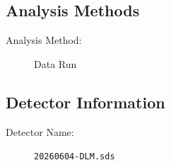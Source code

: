 \documentclass[UTF8,10pt,a4paper,fontset=fandol]{ctexart}
\newcommand{\fieldvalue}[1]{#1}
\newcommand{\handwritten}[1]{#1}
\begin{document}
\subsection{Analysis Methods}

\begin{description}
  \item[Analysis Method:]%
  \fieldvalue{Data Run}
\end{description}

\subsection{Detector Information}

\begin{description}
  \item[Detector Name:]%
  \fieldvalue{\texttt{20260604-DLM.sds}}
\end{description}

\handwritten{}

\handwritten{}

\handwritten{}

\newpage
\end{document}
